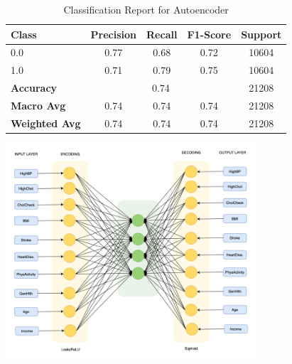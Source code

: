 \begin{table}[h!]
    \centering
    \begin{tabular}{lcccc}
        \hline
        \textbf{Class} & \textbf{Precision} & \textbf{Recall} & \textbf{F1-Score} & \textbf{Support} \\
        \hline
        0.0 & 0.77 & 0.68 & 0.72 & 10604 \\
        1.0 & 0.71 & 0.79 & 0.75 & 10604 \\
        \hline
        \textbf{Accuracy} & \multicolumn{3}{c}{0.74} & 21208 \\
        \textbf{Macro Avg} & 0.74 & 0.74 & 0.74 & 21208 \\
        \textbf{Weighted Avg} & 0.74 & 0.74 & 0.74 & 21208 \\
        \hline
    \end{tabular}
    \caption{Classification Report for Autoencoder}
    \label{tab:autoencoder_classification_report}
\end{table}

\begin{center}
    \includegraphics[width=0.7\textwidth]{images/autoencoder.png}
\end{center}


